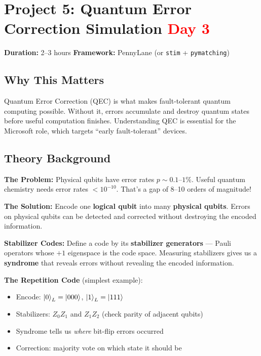 \documentclass[11pt,a4paper]{article}
\begin{document}
\section{Project 5: Quantum Error Correction Simulation \hfill \textcolor{red}{\textbf{Day 3}}}

\begin{questionbox}
\textbf{Duration:} 2--3 hours \quad \textbf{Framework:} PennyLane (or \texttt{stim} + \texttt{pymatching})
\end{questionbox}

\subsection*{Why This Matters}
Quantum Error Correction (QEC) is what makes fault-tolerant quantum computing possible. Without it, errors accumulate and destroy quantum states before useful computation finishes. Understanding QEC is essential for the Microsoft role, which targets ``early fault-tolerant'' devices.

\subsection*{Theory Background}
\textbf{The Problem:} Physical qubits have error rates $p \sim 0.1$--$1\%$. Useful quantum chemistry needs error rates $< 10^{-10}$. That's a gap of 8--10 orders of magnitude!

\textbf{The Solution:} Encode one \textbf{logical qubit} into many \textbf{physical qubits}. Errors on physical qubits can be detected and corrected without destroying the encoded information.

\textbf{Stabilizer Codes:} Define a code by its \textbf{stabilizer generators} --- Pauli operators whose $+1$ eigenspace is the code space. Measuring stabilizers gives us a \textbf{syndrome} that reveals errors without revealing the encoded information.

\textbf{The Repetition Code} (simplest example):
\begin{itemize}
    \item Encode: $\ket{0}_L = \ket{000}$, $\ket{1}_L = \ket{111}$
    \item Stabilizers: $Z_0Z_1$ and $Z_1Z_2$ (check parity of adjacent qubits)
    \item Syndrome tells us \textit{where} bit-flip errors occurred
    \item Correction: majority vote on which state it should be
\end{itemize}
\end{document}
